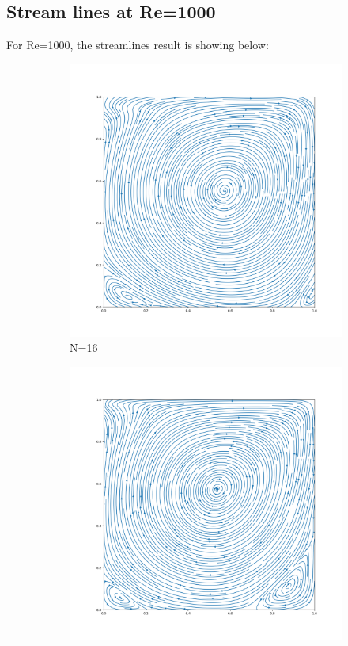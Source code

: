 \documentclass[12pt]{article}
\begin{document}
\subsection{Stream lines at Re=1000}
For Re=1000, the streamlines result is showing below:
\begin{figure}[H]
    \centering
    \begin{subfigure}[b]{0.48\linewidth}
        \includegraphics[width=\linewidth]{figures/Re=1000_result/Re1000_streamline_16.png}
        \caption{N=16}
    \end{subfigure}
    \hspace{-5mm} %
    \begin{subfigure}[b]{0.48\linewidth}
        \includegraphics[width=\linewidth]{figures/Re=1000_result/Re1000_streamline_32.png}

\end{subfigure}
\end{figure}
\end{document}
